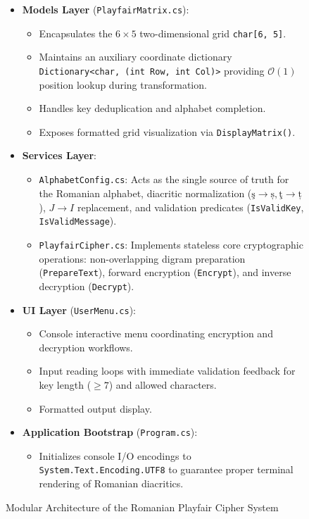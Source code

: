 \documentclass[12pt,a4paper]{article}
\begin{document}
\begin{figure}[h!]
\centering
\begin{tcolorbox}[colback=codebg,colframe=codeframe,arc=2mm,title=\textbf{Architectural Decomposition of RomanianPlayfairCipher}]
\small
\begin{itemize}
    \item \textbf{Models Layer} (\texttt{PlayfairMatrix.cs}):
    \begin{itemize}
        \item Encapsulates the $6 \times 5$ two-dimensional grid \texttt{char[6, 5]}.
        \item Maintains an auxiliary coordinate dictionary \texttt{Dictionary<char, (int Row, int Col)>} providing $\mathcal{O}(1)$ position lookup during transformation.
        \item Handles key deduplication and alphabet completion.
        \item Exposes formatted grid visualization via \texttt{DisplayMatrix()}.
    \end{itemize}
    \item \textbf{Services Layer}:
    \begin{itemize}
        \item \texttt{AlphabetConfig.cs}: Acts as the single source of truth for the Romanian alphabet, diacritic normalization ($\text{ş} \to \text{ș}, \text{ţ} \to \text{ț}$), $J \to I$ replacement, and validation predicates (\texttt{IsValidKey}, \texttt{IsValidMessage}).
        \item \texttt{PlayfairCipher.cs}: Implements stateless core cryptographic operations: non-overlapping digram preparation (\texttt{PrepareText}), forward encryption (\texttt{Encrypt}), and inverse decryption (\texttt{Decrypt}).
    \end{itemize}
    \item \textbf{UI Layer} (\texttt{UserMenu.cs}):
    \begin{itemize}
        \item Console interactive menu coordinating encryption and decryption workflows.
        \item Input reading loops with immediate validation feedback for key length ($\ge 7$) and allowed characters.
        \item Formatted output display.
    \end{itemize}
    \item \textbf{Application Bootstrap} (\texttt{Program.cs}):
    \begin{itemize}
        \item Initializes console I/O encodings to \texttt{System.Text.Encoding.UTF8} to guarantee proper terminal rendering of Romanian diacritics.
    \end{itemize}
\end{itemize}
\end{tcolorbox}
\caption{Modular Architecture of the Romanian Playfair Cipher System}
\label{fig:architecture}
\end{figure}
\end{document}
